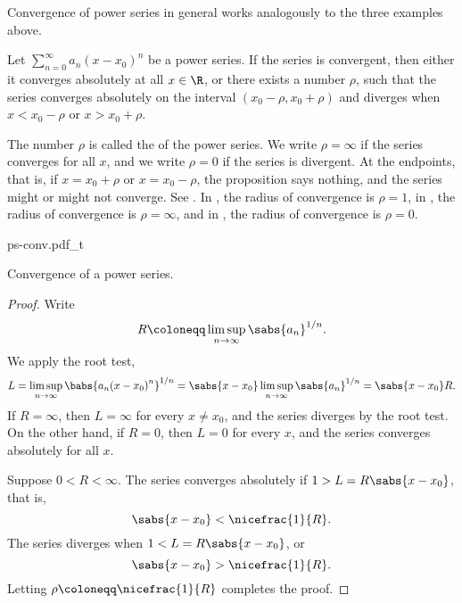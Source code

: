 Convergence of power series in general works analogously to
the three examples above.

\begin{prop} \label{prop:powerserrealradius}
Let $\sum_{n=0}^\infty a_n {(x-x_0)}^n$ be a power series.
If the series is convergent, then either it converges absolutely at
all $x \in \R$, or
there exists a number $\rho$, such that
the series converges absolutely on the interval
$(x_0-\rho,x_0+\rho)$ and diverges when $x < x_0-\rho$ or $x > x_0+\rho$.
\end{prop}

The number $\rho$ is called the \emph{} of the
power series.  We write $\rho = \infty$ if the series converges for
all $x$, and we write $\rho = 0$ if the series is divergent.
At the endpoints, that is, if $x = x_0+\rho$ or $x = x_0-\rho$,
the proposition says nothing,
and the series might or might not converge.
See .
In ,
the radius of convergence is $\rho=1$,
in , the radius of convergence is $\rho=\infty$,
and in , the radius of convergence is $\rho=0$.

\begin{myfigureht}
{ps-conv.pdf_t}
\caption{Convergence of a power series.\label{ps:convfig}}
\end{myfigureht}

\begin{proof}
Write
\begin{equation*}
R \coloneqq \limsup_{n\to\infty} {\sabs{a_n}}^{1/n} .
\end{equation*}
We apply the root test,
\begin{equation*}
L = \limsup_{n\to\infty} {\babs{a_n {(x-x_0)}^n}}^{1/n} 
=
\sabs{x-x_0} \limsup_{n\to\infty} {\sabs{a_n}}^{1/n}
=
\sabs{x-x_0} R .
\end{equation*}
If $R = \infty$, then $L=\infty$ for every $x \not= x_0$, and
the series diverges by the root test.
On the other hand,
if $R = 0$, then $L=0$ for every $x$,
and the series converges absolutely for all $x$.

Suppose $0 < R < \infty$.
The series
converges absolutely if
$1 > L = R \sabs{x-x_0}$,
that is,
\begin{equation*}
\sabs{x-x_0} < \nicefrac{1}{R} .
\end{equation*}
The series diverges when
$1 < L = R \sabs{x-x_0}$,
or
\begin{equation*}
\sabs{x-x_0} > \nicefrac{1}{R} .
\end{equation*}
Letting $\rho \coloneqq \nicefrac{1}{R}$ completes the proof.
\end{proof}

